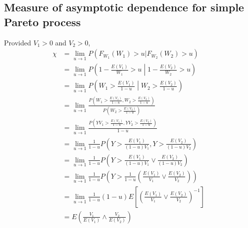 \subsection{Measure of asymptotic dependence for simple Pareto process}

Provided $V_1>0$ and $V_2>0$,
\begin{align*}
\chi &= \lim_{u\rightarrow 1} P(F_{W_1}(W_1) > u | F_{W_2}(W_2) > u) \\
&= \lim_{u\rightarrow 1} P\left(1-\frac{E(V_1)}{W_1} > u \middle| 1-\frac{E(V_2)}{W_2} > u\right) \\
&= \lim_{u\rightarrow 1} P\left(W_1 > \frac{E(V_1)}{1-u} \middle| W_2 > \frac{E(V_2)}{1-u}\right) \\
&= \lim_{u\rightarrow 1} \frac{P\left(W_1 > \frac{E(V_1)}{1-u}, W_2 > \frac{E(V_2)}{1-u}\right)}{P\left(W_2 > \frac{E(V_2)}{1-u}\right)} \\
&= \lim_{u\rightarrow 1} \frac{P\left(YV_1 > \frac{E(V_1)}{1-u}, YV_2 > \frac{E(V_2)}{1-u}\right)}{1-u} \\
&= \lim_{u\rightarrow 1} \frac{1}{1-u}P\left(Y > \frac{E(V_1)}{(1-u)V_1}, Y > \frac{E(V_2)}{(1-u)V_2}\right) \\
&= \lim_{u\rightarrow 1} \frac{1}{1-u}P\left(Y > \frac{E(V_1)}{(1-u)V_1} \vee \frac{E(V_2)}{(1-u)V_2}\right) \\
&= \lim_{u\rightarrow 1} \frac{1}{1-u}P\left(Y > \frac{1}{1-u}\left(\frac{E(V_1)}{V_1} \vee \frac{E(V_2)}{V_2}\right)\right) \\
&= \lim_{u\rightarrow 1} \frac{1}{1-u}(1-u) E\left[\left(\frac{E(V_1)}{V_1} \vee \frac{E(V_2)}{V_2}\right)^{-1}\right] \\
&= E\left(\frac{V_1}{E(V_1)} \wedge \frac{V_2}{E(V_2)}\right) \\
\end{align*}

